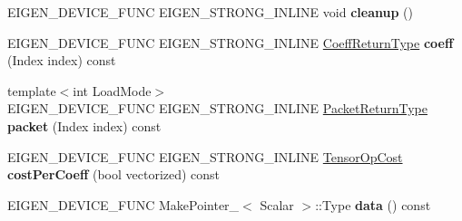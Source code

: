 \begin{DoxyCompactItemize}
E\+I\+G\+E\+N\+\_\+\+D\+E\+V\+I\+C\+E\+\_\+\+F\+U\+NC E\+I\+G\+E\+N\+\_\+\+S\+T\+R\+O\+N\+G\+\_\+\+I\+N\+L\+I\+NE void {\bfseries cleanup} ()
\item 
\mbox{\label{struct_eigen_1_1_tensor_evaluator_3_01const_01_tensor_reduction_op_3_01_op_00_01_dims_00_01_arg_4fdf2ec1445de4704eb590bc98040dc6_a6d5d6ea8a22ba0e68f8893b8397aeaa6}} 
E\+I\+G\+E\+N\+\_\+\+D\+E\+V\+I\+C\+E\+\_\+\+F\+U\+NC E\+I\+G\+E\+N\+\_\+\+S\+T\+R\+O\+N\+G\+\_\+\+I\+N\+L\+I\+NE \hyperlink{group___sparse_core___module}{Coeff\+Return\+Type} {\bfseries coeff} (Index index) const
\item 
\mbox{\label{struct_eigen_1_1_tensor_evaluator_3_01const_01_tensor_reduction_op_3_01_op_00_01_dims_00_01_arg_4fdf2ec1445de4704eb590bc98040dc6_a5cd885d9a9dcb7109d22b7b48967f228}} 
{\footnotesize template$<$int Load\+Mode$>$ }\\E\+I\+G\+E\+N\+\_\+\+D\+E\+V\+I\+C\+E\+\_\+\+F\+U\+NC E\+I\+G\+E\+N\+\_\+\+S\+T\+R\+O\+N\+G\+\_\+\+I\+N\+L\+I\+NE \hyperlink{group___sparse_core___module}{Packet\+Return\+Type} {\bfseries packet} (Index index) const
\item 
\mbox{\label{struct_eigen_1_1_tensor_evaluator_3_01const_01_tensor_reduction_op_3_01_op_00_01_dims_00_01_arg_4fdf2ec1445de4704eb590bc98040dc6_a5ef440034d52be799091923ea9aa95a9}} 
E\+I\+G\+E\+N\+\_\+\+D\+E\+V\+I\+C\+E\+\_\+\+F\+U\+NC E\+I\+G\+E\+N\+\_\+\+S\+T\+R\+O\+N\+G\+\_\+\+I\+N\+L\+I\+NE \hyperlink{class_eigen_1_1_tensor_op_cost}{Tensor\+Op\+Cost} {\bfseries cost\+Per\+Coeff} (bool vectorized) const
\item 
\mbox{\label{struct_eigen_1_1_tensor_evaluator_3_01const_01_tensor_reduction_op_3_01_op_00_01_dims_00_01_arg_4fdf2ec1445de4704eb590bc98040dc6_a3b2c37957974e58731398da2a484d3db}} 
E\+I\+G\+E\+N\+\_\+\+D\+E\+V\+I\+C\+E\+\_\+\+F\+U\+NC Make\+Pointer\+\_\+$<$ Scalar $>$\+::Type {\bfseries data} () const

\end{DoxyCompactItemize}
